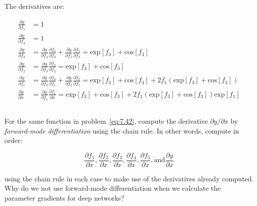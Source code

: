 \documentclass[12pt]{report}
\begin{document}
The derivatives are:

\begin{align*}
    \frac{\partial y}{\partial f_{5}} & = 1                                                                                                                                                                                                                                                            \\
    \frac{\partial y}{\partial f_{4}} & = 1                                                                                                                                                                                                                                                            \\
    \frac{\partial y}{\partial f_{3}} & = \frac{\partial y}{\partial f_{4}}\frac{\partial f_{4}}{\partial f_{3}} + \frac{\partial y}{\partial f_{5}}\frac{\partial f_{5}}{\partial f_{3}} = \text{exp}[f_{3}] + \text{cos}[f_{3}]                                                                      \\
    \frac{\partial y}{\partial f_{2}} & = \frac{\partial y}{\partial f_{3}}\frac{\partial f_{3}}{\partial f_{2}} = \text{exp}[f_{3}]     + \text{cos}[f_{3}]                                                                                                                                           \\
    \frac{\partial y}{\partial f_{1}} & = \frac{\partial y}{\partial f_{3}}\frac{\partial f_{3}}{\partial f_{1}} + \frac{\partial y}{\partial f_{2}}\frac{\partial f_{2}}{\partial f_{1}} =           \text{exp}[f_{3}]     + \text{cos}[f_{3}]  + 2f_{1}(\text{exp}[f_{3}]     + \text{cos}[f_{3}]  ) \\
    \frac{\partial y}{\partial x}     & = \frac{\partial y}{\partial f_{1}}\frac{\partial f_{1}}{\partial x} = \text{exp}[f_{3}]     + \text{cos}[f_{3}]  + 2f_{1}(\text{exp}[f_{3}]     + \text{cos}[f_{3}]  )\text{exp}[f_{1}]
\end{align*}

\null
\subsection{}
\begin{mdframed}
    For the same function in problem~\ref{eq:7.42}, compute the derivative $\partial y / \partial x$ by \textit{forward-mode differentiation} using the chain rule. In other words, compute in order:

    \begin{equation*}
        \frac{\partial f_{1}}{\partial x}, \frac{\partial f_{2}}{\partial x}, \frac{\partial f_{3}}{\partial x}, \frac{\partial f_{4}}{\partial x}, \frac{\partial f_{5}}{\partial x}, \text{and} \frac{\partial y}{\partial x}
    \end{equation*}

    using the chain rule in each case to make use of the derivatives already computed. Why do we not use forward-mode differentiation when we calculate the parameter gradients for deep networks?
\end{mdframed}
\end{document}
